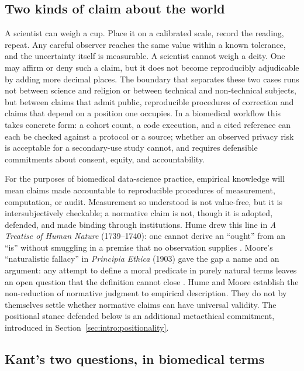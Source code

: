 \documentclass[11pt,letterpaper]{article}
\begin{document}
\subsection{Two kinds of claim about the world}
\label{sec:intro:knowledge-belief}

A scientist can weigh a cup. Place it on a calibrated scale, record
the reading, repeat. Any careful observer reaches the same value within
a known tolerance, and the uncertainty itself is measurable. A scientist
cannot weigh a deity. One may affirm or deny such a claim, but it does
not become reproducibly adjudicable by adding more decimal places. The
boundary that separates these two cases runs not between science and
religion or between technical and non-technical subjects, but between
claims that admit public, reproducible procedures of correction and
claims that depend on a position one occupies. In a biomedical workflow
this takes concrete form: a cohort count, a code execution, and a cited
reference can each be checked against a protocol or a source; whether
an observed privacy risk is acceptable for a secondary-use study cannot,
and requires defensible commitments about consent, equity, and
accountability.

For the purposes of biomedical data-science practice, empirical
knowledge will mean claims made accountable to reproducible procedures
of measurement, computation, or audit. Measurement so understood is
not value-free, but it is intersubjectively checkable; a normative
claim is not, though it is adopted, defended, and made binding through
institutions. Hume drew this line in \emph{A Treatise of Human Nature}
(1739--1740): one cannot derive an ``ought'' from an ``is'' without
smuggling in a premise that no observation supplies
\cite{hume1739treatise}. Moore's ``naturalistic
fallacy'' in \emph{Principia Ethica} (1903) gave the gap a name and an
argument: any attempt to define a moral predicate in purely natural
terms leaves an open question that the definition cannot close
\cite{moore1903principia}. Hume and Moore establish the non-reduction
of normative judgment to empirical description. They do not by
themselves settle whether normative claims can have universal validity.
The positional stance defended below is an additional metaethical
commitment, introduced in Section~\ref{sec:intro:positionality}.

\subsection{Kant's two questions, in biomedical terms}
\label{sec:intro:kant}
\end{document}
